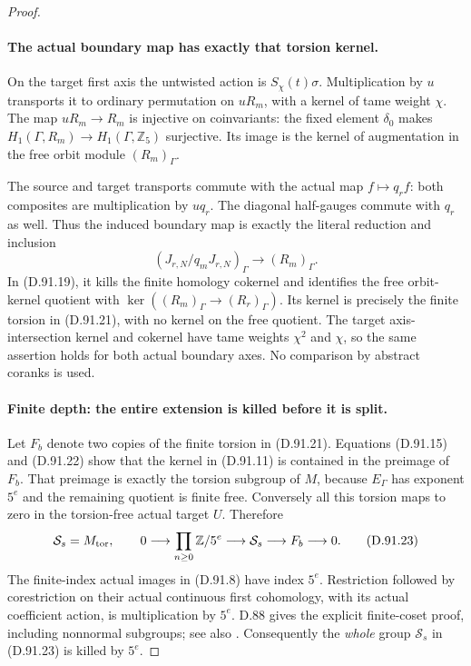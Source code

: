 \begin{proof}
\paragraph{The actual boundary map has exactly that torsion kernel.}
On the target first axis the untwisted action is
\(S_\chi(t)\sigma\). Multiplication by \(u\) transports
it to ordinary permutation on \(uR_m\), with a kernel
of tame weight \(\chi\). The map \(uR_m\to R_m\)
is injective on coinvariants: the fixed element \(\delta_0\)
makes \(H_1(\Gamma,R_m)\to H_1(\Gamma,\mathbb Z_5)\)
surjective. Its image is the kernel of augmentation in
the free orbit module \((R_m)_\Gamma\).

The source and target transports commute with the actual
map \(f\mapsto q_rf\): both composites are multiplication
by \(u q_r\). The diagonal half-gauges commute with
\(q_r\) as well. Thus the induced boundary map is
exactly the literal reduction and inclusion
\[
 (J_{r,N}/q_mJ_{r,N})_\Gamma\longrightarrow(R_m)_\Gamma.
                                                               \tag{D.91.22}
\]
In (D.91.19), it kills the finite homology cokernel and
identifies the free orbit-kernel quotient with
\(\ker((R_m)_\Gamma\to(R_r)_\Gamma)\). Its kernel
is precisely the finite torsion in (D.91.21), with no
kernel on the free quotient. The target axis-intersection
kernel and cokernel have tame weights \(\chi^2\) and
\(\chi\), so the same assertion holds for both actual
boundary axes. No comparison by abstract coranks is used.

\paragraph{Finite depth: the entire extension is killed before it is split.}
Let \(F_b\) denote two copies of the finite torsion in
(D.91.21). Equations (D.91.15) and (D.91.22) show that
the kernel in (D.91.11) is contained in the preimage
of \(F_b\). That preimage is exactly the torsion subgroup
of \(M\), because \(E_\Gamma\) has exponent \(5^e\)
and the remaining quotient is finite free. Conversely all
this torsion maps to zero in the torsion-free actual target
\(U\). Therefore
\[
  \mathcal S_s=M_{\rm tor},\qquad
 0\longrightarrow\prod_{n\ge0}\mathbb Z/5^e
   \longrightarrow\mathcal S_s\longrightarrow F_b\longrightarrow0.
                                                               \tag{D.91.23}
\]
The finite-index actual images in (D.91.8) have index
\(5^e\). Restriction followed by corestriction on their
actual continuous first cohomology, with its actual
coefficient action, is multiplication by \(5^e\).
D.88 gives the explicit finite-coset proof, including
nonnormal subgroups; see also \cite[II, Proposition 1.30]{PBC_MilneCFT}.
Consequently the \emph{whole} group \(\mathcal S_s\)
in (D.91.23) is killed by \(5^e\).


\end{proof}
